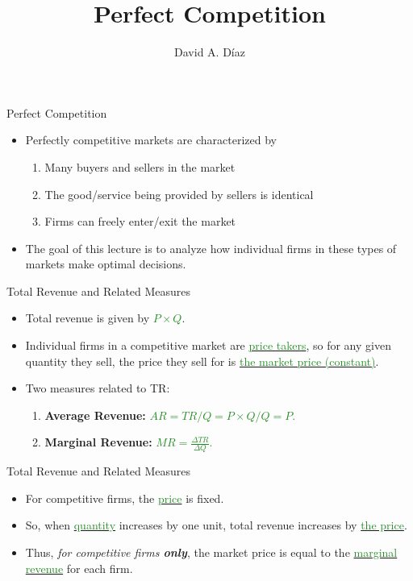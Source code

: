 \documentclass[xcolor={dvipsnames},pdf, hyperref={colorlinks=true, citecolor=ForestGreen, linkcolor=BlueViolet, urlcolor=Magenta}, handout]{beamer}
\title{Perfect Competition}
\author{David A. D\'iaz}
\institute{UNC Chapel Hill}
\date{}
\newcommand{\ddp}[1]{{\textcolor{ForestGreen}{#1}}}
\newcommand{\dd}[1]{{\underline{\textcolor{ForestGreen}{#1}}}}
\begin{document}
 
	
	\begin{frame}
		
		\titlepage
		
	\end{frame}
	

\begin{frame}{Perfect Competition}
\begin{itemize}
	\item 	Perfectly competitive markets are characterized by
	\begin{enumerate}
		\item Many buyers and sellers in the market
		\item The good/service being provided by sellers is identical
		\item Firms can freely enter/exit the market
	\end{enumerate}
	
	\item The goal of this lecture is to analyze how individual firms in these types of markets make optimal decisions.
\end{itemize}
\end{frame}

\begin{frame}{Total Revenue and Related Measures}
	\begin{itemize}
		\item 	Total revenue is given by \dd{$P\times Q$}.
		\item Individual firms in a competitive market are \dd{price takers}, so for any given quantity they sell, the price they sell for is \dd{the market price (constant)}.
		
		\item Two measures related to TR:
		\begin{enumerate}
			\item \textbf{Average Revenue:} \ddp{$AR = TR/Q = P\times Q/Q = P$.}
			\item \textbf{Marginal Revenue:} \ddp{$MR = \frac{\Delta TR}{\Delta Q}$.}
		\end{enumerate}
		
	\end{itemize}
\end{frame}

\begin{frame}{Total Revenue and Related Measures}
	\begin{itemize}
			\item For competitive firms, the \dd{price} is fixed. 
			\item So, when \dd{quantity} increases by one unit, total revenue increases by \dd{the price}. 
			\item Thus, \textit{for competitive firms \textbf{only}}, the market price is equal to the \dd{marginal revenue} for each firm.
	\end{itemize}
\end{frame}
\end{document}
